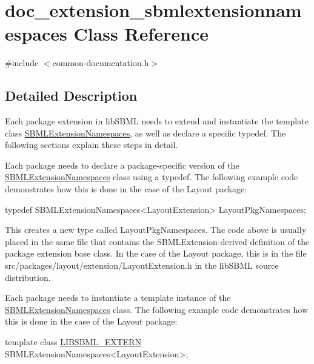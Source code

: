 \hypertarget{classdoc__extension__sbmlextensionnamespaces}{}\section{doc\+\_\+extension\+\_\+sbmlextensionnamespaces Class Reference}
\label{classdoc__extension__sbmlextensionnamespaces}


{\ttfamily \#include $<$common-\/documentation.\+h$>$}



\subsection{Detailed Description}
\begin{DoxyParagraph}{}
Each package extension in lib\+S\+B\+ML needs to extend and instantiate the template class \hyperlink{class_s_b_m_l_extension_namespaces}{S\+B\+M\+L\+Extension\+Namespaces}, as well as declare a specific {\ttfamily typedef}. The following sections explain these steps in detail.
\end{DoxyParagraph}


Each package needs to declare a package-\/specific version of the \hyperlink{class_s_b_m_l_extension_namespaces}{S\+B\+M\+L\+Extension\+Namespaces} class using a {\ttfamily typedef}. The following example code demonstrates how this is done in the case of the Layout package\+:


\begin{DoxyCode}
\textcolor{keyword}{typedef} SBMLExtensionNamespaces<LayoutExtension> LayoutPkgNamespaces;
\end{DoxyCode}


This creates a new type called Layout\+Pkg\+Namespaces. The code above is usually placed in the same file that contains the S\+B\+M\+L\+Extension-\/derived definition of the package extension base class. In the case of the Layout package, this is in the file {\ttfamily src/packages/layout/extension/\+Layout\+Extension.\+h} in the lib\+S\+B\+ML source distribution.

Each package needs to instantiate a template instance of the \hyperlink{class_s_b_m_l_extension_namespaces}{S\+B\+M\+L\+Extension\+Namespaces} class. The following example code demonstrates how this is done in the case of the Layout package\+:


\begin{DoxyCode}
\textcolor{keyword}{template} \textcolor{keyword}{class }\hyperlink{extern_8h_a8e9e5118f0c55d410f8bc217f2954dbf}{LIBSBML\_EXTERN} SBMLExtensionNamespaces<LayoutExtension>;
\end{DoxyCode}


